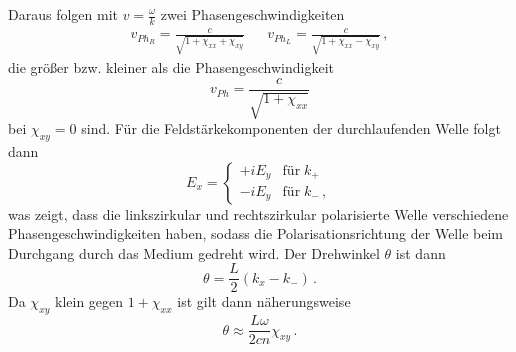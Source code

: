 Daraus folgen mit $v = \frac{\omega}{k}$ zwei Phasengeschwindigkeiten
\begin{align*}
    v_{Ph_R} = \frac{c}{\sqrt{1 + \chi_{xx} + \chi_{xy}}} && v_{Ph_L} = \frac{c}{\sqrt{1 + \chi_{xx} - \chi_{xy}}} \, ,
\end{align*}
die größer bzw. kleiner als die Phasengeschwindigkeit 
\begin{equation*}
    v_{Ph} = \frac{c}{\sqrt{1 + \chi_{xx}}}
\end{equation*}
bei $\chi_{xy} = 0$ sind. Für die Feldstärkekomponenten der durchlaufenden Welle folgt dann
\begin{equation*}
    E_x = \begin{cases}
        + i E_y & \text{für} \; k_{+} \\
        - i E_y & \text{für} \; k_{-} \, ,
    \end{cases}
\end{equation*}
was zeigt, dass die linkszirkular und rechtszirkular polarisierte Welle verschiedene Phasengeschwindigkeiten haben, 
sodass die Polarisationsrichtung der Welle beim Durchgang durch das Medium gedreht wird. Der Drehwinkel $\theta$ ist dann
\begin{equation*}
    \theta = \frac{L}{2} \left(k_{x} - k_{-}\right) \, .
\end{equation*}
Da $\chi_{xy}$ klein gegen $1 + \chi_{xx}$ ist gilt dann näherungsweise
\begin{equation*}
    \theta \approx \frac{L \omega}{2 c n} \chi_{xy} \, .
\end{equation*}
